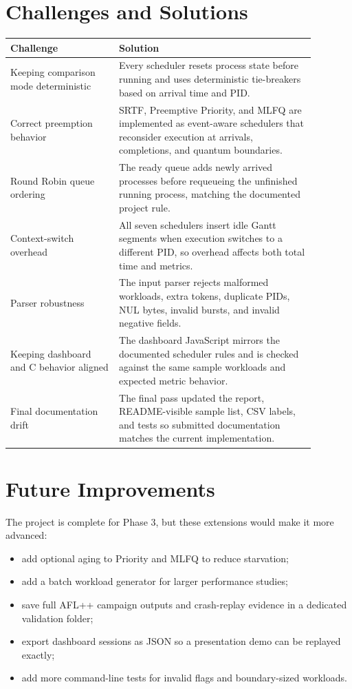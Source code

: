 \documentclass[11pt]{article}
\begin{document}
\section{Challenges and Solutions}

\begin{longtable}{p{0.31\linewidth}p{0.57\linewidth}}
\toprule
\textbf{Challenge} & \textbf{Solution} \\
\midrule
Keeping comparison mode deterministic & Every scheduler resets process state
before running and uses deterministic tie-breakers based on arrival time and
PID. \\
Correct preemption behavior & SRTF, Preemptive Priority, and MLFQ are
implemented as event-aware schedulers that reconsider execution at arrivals,
completions, and quantum boundaries. \\
Round Robin queue ordering & The ready queue adds newly arrived processes
before requeueing the unfinished running process, matching the documented
project rule. \\
Context-switch overhead & All seven schedulers insert idle Gantt segments when
execution switches to a different PID, so overhead affects both total time and
metrics. \\
Parser robustness & The input parser rejects malformed workloads, extra
tokens, duplicate PIDs, NUL bytes, invalid bursts, and invalid negative fields. \\
Keeping dashboard and C behavior aligned & The dashboard JavaScript mirrors
the documented scheduler rules and is checked against the same sample
workloads and expected metric behavior. \\
Final documentation drift & The final pass updated the report, README-visible
sample list, CSV labels, and tests so submitted documentation matches the
current implementation. \\
\bottomrule
\end{longtable}

\section{Future Improvements}

The project is complete for Phase 3, but these extensions would make it more
advanced:

\begin{itemize}
  \item add optional aging to Priority and MLFQ to reduce starvation;
  \item add a batch workload generator for larger performance studies;
  \item save full AFL++ campaign outputs and crash-replay evidence in a
  dedicated validation folder;
  \item export dashboard sessions as JSON so a presentation demo can be replayed
  exactly;
  \item add more command-line tests for invalid flags and boundary-sized
  workloads.
\end{itemize}
\end{document}

